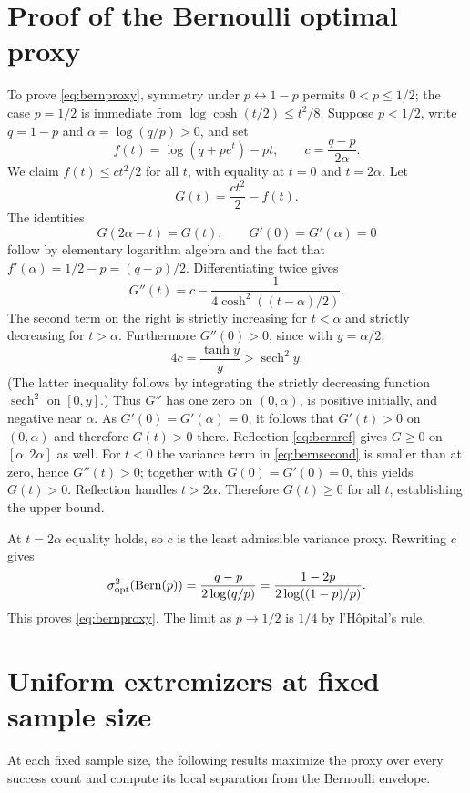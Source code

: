 \documentclass[11pt,a4paper]{article}
\begin{document}
\section{Proof of the Bernoulli optimal proxy}\label{app:bernoulli}
To prove \eqref{eq:bernproxy}, symmetry under $p\leftrightarrow1-p$ permits $0<p\le1/2$; the case $p=1/2$ is immediate from $\log\cosh(t/2)\le t^2/8$. Suppose $p<1/2$, write $q=1-p$ and $\alpha=\log(q/p)>0$, and set
\[
 f(t)=\log(q+pe^t)-pt,\qquad
 c=\frac{q-p}{2\alpha}.
\]
We claim $f(t)\le ct^2/2$ for all $t$, with equality at $t=0$ and $t=2\alpha$. Let
\[
 G(t)=\frac{ct^2}{2}-f(t).
\]
The identities
\begin{equation}\label{eq:bernref}
 G(2\alpha-t)=G(t),\qquad
 G'(0)=G'(\alpha)=0
\end{equation}
follow by elementary logarithm algebra and the fact that $f'(\alpha)=1/2-p=(q-p)/2$. Differentiating twice gives
\begin{equation}\label{eq:bernsecond}
 G''(t)=c-\frac1{4\cosh^2((t-\alpha)/2)}.
\end{equation}
The second term on the right is strictly increasing for $t<\alpha$ and strictly decreasing for $t>\alpha$. Furthermore $G''(0)>0$, since with $y=\alpha/2$,
\[
 4c=\frac{\tanh y}{y}>\operatorname{sech}^2 y.
\]
(The latter inequality follows by integrating the strictly decreasing function $\operatorname{sech}^2$ on $[0,y]$.) Thus $G''$ has one zero on $(0,\alpha)$, is positive initially, and negative near $\alpha$. As $G'(0)=G'(\alpha)=0$, it follows that $G'(t)>0$ on $(0,\alpha)$ and therefore $G(t)>0$ there. Reflection \eqref{eq:bernref} gives $G\ge0$ on $[\alpha,2\alpha]$ as well. For $t<0$ the variance term in \eqref{eq:bernsecond} is smaller than at zero, hence $G''(t)>0$; together with $G(0)=G'(0)=0$, this yields $G(t)>0$. Reflection handles $t>2\alpha$. Therefore $G(t)\ge0$ for all $t$, establishing the upper bound.

At $t=2\alpha$ equality holds, so $c$ is the least admissible variance proxy. Rewriting $c$ gives
\[
 \sigma^2_{\mathrm{opt}}(\operatorname{Bern}(p))
 =\frac{q-p}{2\log(q/p)}=
 \frac{1-2p}{2\log((1-p)/p)}.
\]
This proves \eqref{eq:bernproxy}. The limit as $p\to1/2$ is $1/4$ by l'H\^opital's rule.


\clearpage

\section{Uniform extremizers at fixed sample size}\label{sec:uniform_fixed}
At each fixed sample size, the following results maximize the proxy over every success count and compute its local separation from the Bernoulli envelope.
\end{document}
